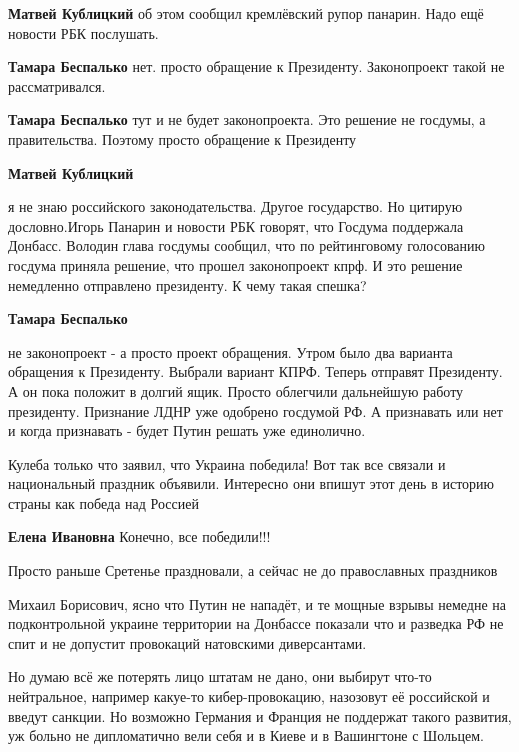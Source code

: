 \begin{itemize}
\begin{itemize}
\textbf{Матвей Кублицкий} об этом сообщил кремлёвский рупор панарин. Надо ещё новости РБК послушать.

\textbf{Тамара Беспалько} нет. просто обращение к Президенту. Законопроект такой не рассматривался.

\textbf{Тамара Беспалько} тут и не будет законопроекта. Это решение не госдумы, а правительства. Поэтому просто обращение к Президенту

\textbf{Матвей Кублицкий} 

я не знаю российского законодательства. Другое государство. Но цитирую
дословно.Игорь Панарин и новости РБК говорят, что Госдума поддержала Донбасс.
Володин глава госдумы сообщил, что по рейтинговому голосованию госдума приняла
решение, что прошел законопроект кпрф. И это решение немедленно отправлено
президенту. К чему такая спешка?

\textbf{Тамара Беспалько} 

не законопроект - а просто проект обращения. Утром было два варианта обращения
к Президенту. Выбрали вариант КПРФ. Теперь отправят Президенту. А он пока
положит в долгий ящик. Просто облегчили дальнейшую работу президенту. Признание
ЛДНР уже одобрено госдумой РФ. А признавать или нет и когда признавать - будет
Путин решать уже единолично.


\end{itemize} %


Кулеба только что заявил, что Украина победила! Вот так все связали и
национальный праздник объявили. Интересно они впишут этот день в историю страны
как победа над Россией

\textbf{Елена Ивановна} Конечно, все победили!!!

Просто раньше Сретенье праздновали, а сейчас не до православных праздников


Михаил Борисович, ясно что Путин не нападёт, и те мощные взрывы немедне на
подконтрольной украине территории на Донбассе показали что и разведка РФ не
спит и не допустит провокаций натовскими диверсантами.

Но думаю всё же потерять лицо штатам не дано, они выбирут что-то нейтральное,
например какуе-то кибер-провокацию, назозовут её российской и введут санкции.
Но возможно Германия и Франция не поддержат такого развития, уж больно не
дипломатично вели себя и в Киеве и в Вашингтоне с Шольцем.


\end{itemize}
